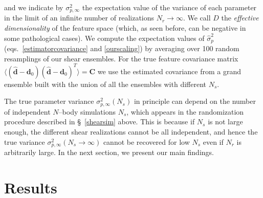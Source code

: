 \documentclass[reprint,aps,prd,superscriptaddress,showkeys,showpacs]{revtex4-1}
\newcommand{\bb}[1]{\mathbf{#1}}
\newcommand{\bbh}[1]{\mathbf{\hat{#1}}}
\newcommand{\h}[1]{\hat{#1}}
\begin{document}
and we indicate by $\sigma^2_{p,\infty}$ the expectation value of the variance of each parameter in the limit of an infinite number of realizations
$N_r\rightarrow\infty$.  We call $D$ the \textit{effective dimensionality} of the feature space (which, as seen before, can be
negative in some pathological cases).
We compute the expectation values of $\h{\sigma}^2_p$
(eqs.~\ref{estimatorcovariance} and \ref{ourscaling}) by
averaging over 100 random resamplings of our shear ensembles. For the
true feature covariance matrix $\langle(\bbh{d}-\bb{d}_0)(\bbh{d}-\bb{d}_0)^T\rangle=\bb{C}$ we use
the estimated covariance from a grand ensemble built with the union of
all the ensembles with different $N_s$.

The true parameter variance $\sigma^2_{p,\infty}(N_s)$ in principle
can depend on the number of independent $N$--body simulations $N_s$,
which appears in the randomization procedure described in
\S~\ref{shearsim} above. This is because if $N_s$ is not large enough,
the different shear realizations cannot be all independent, and hence
the true variance $\sigma^2_{p,\infty}(N_s\rightarrow\infty)$ cannot
be recovered for low $N_s$ even if $N_r$ is arbitrarily large. In the
next section, we present our main findings.
 


\section{Results} 

\end{document}
